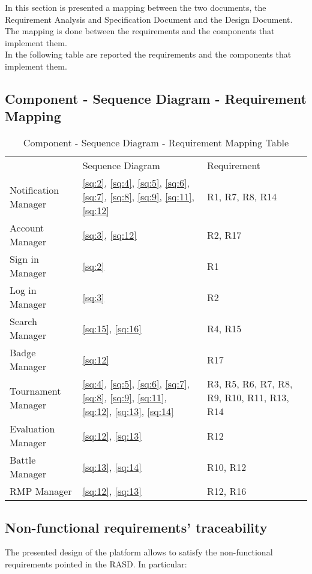 In this section is presented a mapping between the two documents, the Requirement Analysis and Specification Document and the Design Document. The mapping is done between the requirements and the components that implement them.\\
In the following table are reported the requirements and the components that implement them.

\subsection{Component - Sequence Diagram - Requirement Mapping} \label{uc:mapping}
\begin{table}[H]
\begin{center}
    \begin{tabu}{|X[.3]|X[.4]|X[.3]|} \hline \everyrow{\hline}
        & Sequence Diagram & Requirement \\
        Notification Manager & \ref{sq:2}, \ref{sq:4}, \ref{sq:5}, \ref{sq:6}, \ref{sq:7}, \ref{sq:8}, \ref{sq:9}, \ref{sq:11}, \ref{sq:12}  & R1, R7, R8, R14\\ 
        Account Manager & \ref{sq:3}, \ref{sq:12}  & R2, R17\\
        Sign in Manager & \ref{sq:2} & R1\\
        Log in Manager & \ref{sq:3} & R2\\
        Search Manager & \ref{sq:15}, \ref{sq:16}& R4, R15\\
        Badge Manager & \ref{sq:12} & R17\\
        Tournament Manager & \ref{sq:4}, \ref{sq:5}, \ref{sq:6}, \ref{sq:7}, \ref{sq:8}, \ref{sq:9}, \ref{sq:11}, \ref{sq:12}, \ref{sq:13}, \ref{sq:14} & R3, R5, R6, R7, R8, R9, R10, R11, R13, R14\\
        Evaluation Manager & \ref{sq:12}, \ref{sq:13} & R12\\
        Battle Manager & \ref{sq:13}, \ref{sq:14} & R10, R12\\
        RMP Manager & \ref{sq:12}, \ref{sq:13} & R12, R16\\
    \end{tabu}
\end{center}
\caption{Component - Sequence Diagram - Requirement Mapping Table}
\end{table}

\subsection{Non-functional requirements' traceability}
The presented design of the platform allows to satisfy the non-functional requirements pointed in the RASD. In particular:
